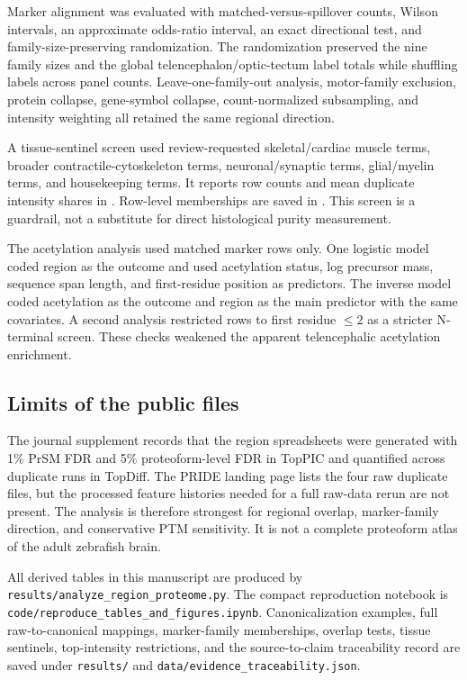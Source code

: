 Marker alignment was evaluated with matched-versus-spillover counts, Wilson intervals, an approximate odds-ratio interval, an exact directional test, and family-size-preserving randomization. The randomization preserved the nine family sizes and the global telencephalon/optic-tectum label totals while shuffling labels across panel counts. Leave-one-family-out analysis, motor-family exclusion, protein collapse, gene-symbol collapse, count-normalized subsampling, and intensity weighting all retained the same regional direction.

A tissue-sentinel screen used review-requested skeletal/cardiac muscle terms, broader contractile-cytoskeleton terms, neuronal/synaptic terms, glial/myelin terms, and housekeeping terms. It reports row counts and mean duplicate intensity shares in . Row-level memberships are saved in . This screen is a guardrail, not a substitute for direct histological purity measurement.

The acetylation analysis used matched marker rows only. One logistic model coded region as the outcome and used acetylation status, log precursor mass, sequence span length, and first-residue position as predictors. The inverse model coded acetylation as the outcome and region as the main predictor with the same covariates. A second analysis restricted rows to first residue $\leq 2$ as a stricter N-terminal screen. These checks weakened the apparent telencephalic acetylation enrichment.

\subsection{Limits of the public files}

The journal supplement records that the region spreadsheets were generated with 1\% PrSM FDR and 5\% proteoform-level FDR in TopPIC and quantified across duplicate runs in TopDiff. The PRIDE landing page lists the four raw duplicate files, but the processed feature histories needed for a full raw-data rerun are not present. The analysis is therefore strongest for regional overlap, marker-family direction, and conservative PTM sensitivity. It is not a complete proteoform atlas of the adult zebrafish brain.

All derived tables in this manuscript are produced by \texttt{results/analyze\_region\_proteome.py}. The compact reproduction notebook is \texttt{code/reproduce\_tables\_and\_figures.ipynb}. Canonicalization examples, full raw-to-canonical mappings, marker-family memberships, overlap tests, tissue sentinels, top-intensity restrictions, and the source-to-claim traceability record are saved under \texttt{results/} and \texttt{data/evidence\_traceability.json}.
